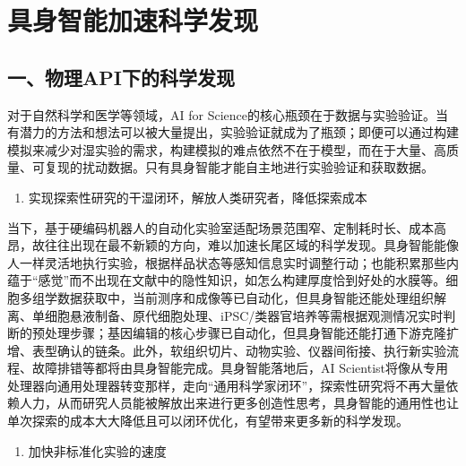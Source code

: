 \setcounter{section}{1}

\hypertarget{ux5177ux8eabux667aux80fdux52a0ux901fux79d1ux5b66ux53d1ux73b0}{%
\section{具身智能加速科学发现}\label{ux5177ux8eabux667aux80fdux52a0ux901fux79d1ux5b66ux53d1ux73b0}}

\hypertarget{ux4e00ux7269ux7406apiux4e0bux7684ux79d1ux5b66ux53d1ux73b0}{%
\subsection{一、物理API下的科学发现}\label{ux4e00ux7269ux7406apiux4e0bux7684ux79d1ux5b66ux53d1ux73b0}}

对于自然科学和医学等领域，AI for Science的核心瓶颈在于数据与实验验证。当有潜力的方法和想法可以被大量提出，实验验证就成为了瓶颈；即便可以通过构建模拟来减少对湿实验的需求，构建模拟的难点依然不在于模型，而在于大量、高质量、可复现的扰动数据。只有具身智能才能自主地进行实验验证和获取数据。

\begin{enumerate}
\def\labelenumi{\arabic{enumi}.}
\tightlist
\item
  实现探索性研究的干湿闭环，解放人类研究者，降低探索成本
\end{enumerate}

当下，基于硬编码机器人的自动化实验室适配场景范围窄、定制耗时长、成本高昂，故往往出现在最不新颖的方向，难以加速长尾区域的科学发现。具身智能能像人一样灵活地执行实验，根据样品状态等感知信息实时调整行动；也能积累那些内蕴于``感觉''而不出现在文献中的隐性知识，如怎么构建厚度恰到好处的水膜等。细胞多组学数据获取中，当前测序和成像等已自动化，但具身智能还能处理组织解离、单细胞悬液制备、原代细胞处理、iPSC/类器官培养等需根据观测情况实时判断的预处理步骤；基因编辑的核心步骤已自动化，但具身智能还能打通下游克隆扩增、表型确认的链条。此外，软组织切片、动物实验、仪器间衔接、执行新实验流程、故障排错等都将由具身智能完成。具身智能落地后，AI Scientist将像从专用处理器向通用处理器转变那样，走向``通用科学家闭环''，探索性研究将不再大量依赖人力，从而研究人员能被解放出来进行更多创造性思考，具身智能的通用性也让单次探索的成本大大降低且可以闭环优化，有望带来更多新的科学发现。

\begin{enumerate}
\def\labelenumi{\arabic{enumi}.}
\setcounter{enumi}{1}
\tightlist
\item
  加快非标准化实验的速度
\end{enumerate}

